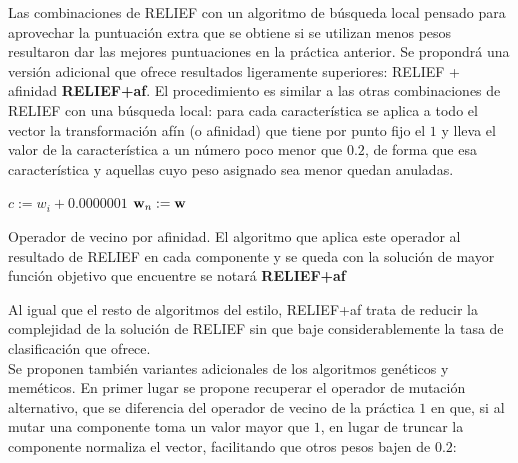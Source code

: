 \documentclass{article}
\newenvironment{algo}{
	\vspace*{0.5cm}
	\begin{algorithm}[H]}{
	\end{algorithm}
	\vspace*{0.5cm}
}
\begin{document}
Las combinaciones de RELIEF con un algoritmo de búsqueda local pensado para aprovechar la puntuación extra que se obtiene si se utilizan menos pesos resultaron dar las mejores puntuaciones en la práctica anterior. Se propondrá una versión adicional que ofrece resultados ligeramente superiores: RELIEF + afinidad \textbf{RELIEF+af}. El procedimiento es similar a las otras combinaciones de RELIEF con una búsqueda local: para cada característica se aplica a todo el vector la transformación afín (o afinidad) que tiene por punto fijo el $1$ y lleva el valor de la característica a un número poco menor que $0.2$, de forma que esa característica y aquellas cuyo peso asignado sea menor quedan anuladas.

\begin{algo}
	
	$c := w_i + 0.0000001$
	$\normalfont \textbf w_n := \normalfont \textbf w$\;
	\vspace{0.2cm}
	\caption{Operador de vecino por afinidad. El algoritmo que aplica este operador al resultado de RELIEF en cada componente y se queda con la solución de mayor función objetivo que encuentre se notará \textbf{RELIEF+af}}
\end{algo}

Al igual que el resto de algoritmos del estilo, RELIEF+af trata de reducir la complejidad de la solución de RELIEF sin que baje considerablemente la tasa de clasificación que ofrece. \\

Se proponen también variantes adicionales de los algoritmos genéticos y meméticos. En primer lugar se propone recuperar el operador de mutación alternativo, que se diferencia del operador de vecino de la práctica $1$ en que, si al mutar una componente toma un valor mayor que $1$, en lugar de truncar la componente normaliza el vector, facilitando que otros pesos bajen de $0.2$:
\end{document}
